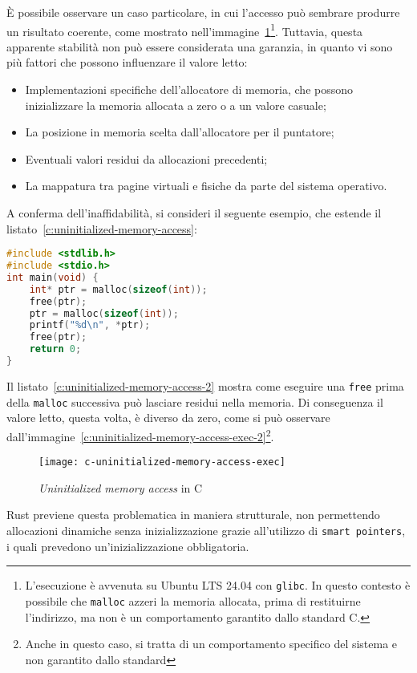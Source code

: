 È possibile osservare un caso particolare, in cui l'accesso può sembrare produrre un risultato coerente, come mostrato nell'immagine~\ref{c:uninitialized-memory-access-exec}\footnote{L'esecuzione è avvenuta su Ubuntu LTS 24.04 con \texttt{glibc}. In questo contesto è possibile che \texttt{malloc} azzeri la memoria allocata, prima di restituirne l'indirizzo, ma non è un comportamento garantito dallo standard C.}.
Tuttavia, questa apparente stabilità non può essere considerata una garanzia, in quanto vi sono più fattori che possono influenzare il valore letto:
\begin{itemize}
    \item Implementazioni specifiche dell'allocatore di memoria, che possono inizializzare la memoria allocata a zero o a un valore casuale;
    \item La posizione in memoria scelta dall'allocatore per il puntatore;
    \item Eventuali valori residui da allocazioni precedenti;
    \item La mappatura tra pagine virtuali e fisiche da parte del sistema operativo.
\end{itemize}
A conferma dell'inaffidabilità, si consideri il seguente esempio, che estende il listato~\ref{c:uninitialized-memory-access}: 
\begin{lstlisting}[language=C, caption={Uninitialized memory access in C}, label={c:uninitialized-memory-access-2}]
#include <stdlib.h>
#include <stdio.h>
int main(void) {
    int* ptr = malloc(sizeof(int));
    free(ptr);
    ptr = malloc(sizeof(int));
    printf("%d\n", *ptr);
    free(ptr);
    return 0;
}
\end{lstlisting}
Il listato~\ref{c:uninitialized-memory-access-2} mostra come eseguire una \texttt{free} prima della \texttt{malloc} successiva può lasciare residui nella memoria. 
Di conseguenza il valore letto, questa volta, è diverso da zero, come si può osservare dall'immagine~\ref{c:uninitialized-memory-access-exec-2}\footnote{Anche in questo caso, si tratta di un comportamento specifico del sistema e non garantito dallo standard}.
\begin{figure}[htbp]
\begin{center}
    \texttt{[image: c-uninitialized-memory-access-exec]}
    \caption{\textit{Uninitialized memory access} in C}\label{c:uninitialized-memory-access-exec}
    \end{center}
\end{figure}
Rust previene questa problematica in maniera strutturale, non permettendo allocazioni dinamiche senza inizializzazione grazie all'utilizzo di \texttt{smart pointers}, i quali prevedono un'inizializzazione obbligatoria.

